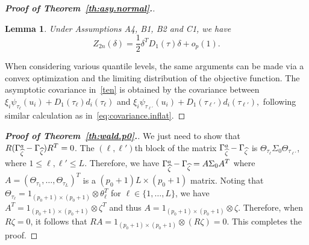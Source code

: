 \documentclass[times,sort&compress,3p]{elsarticle}
\theoremstyle{plain}%
\newtheorem{lemma}{Lemma}
\theoremstyle{definition}
\newcommand{\bD}{{D}}
\newcommand{\bR}{{R}}
\newcommand{\btheta}{{\theta}}
\newcommand{\bzeta}{{\zeta}}
\newcommand{\bxi}{{\xi}}
\begin{document}
\begin{proof}[\textbf{\upshape Proof of Theorem~\ref{th:asy.normal}.}]






\begin{lemma}
	\label{lemma:z2n}
	Under Assumptions A4, B1, B2 and C1, we have 
	\begin{equation}
	Z_{2n}({\delta}) = \frac{1}{2}{\delta}^T \bD_1(\tau) {\delta} + o_p(1).
	\end{equation} 
\end{lemma}

 When considering various quantile levels, the same arguments can be made via a convex optimization and the limiting distribution of the objective function. The asymptotic covariance in~\eqref{ten} is obtained by the covariance between 
$\bxi_{i} \psi_{\tau_{\ell}}({u}_i) + \bD_1(\tau_{\ell}) {d}_i(\tau_{\ell}) $ and $\bxi_{i} \psi_{\tau_{\ell'}}({u}_i) + \bD_1(\tau_{\ell'}) {d}_i(\tau_{\ell'}), $ following similar calculation as in~\eqref{eq:covariance.inflat}. 
\end{proof}

\begin{proof}[\textbf{\upshape Proof of Theorem~\ref{th:wald.p0}.}]
We just need to show that $\bR (\SigmaAdj_{\widehat \bzeta} - {\Gamma}_{\widehat \bzeta}) \bR^T = 0$. 
The $(\ell, \ell')$th block of the matrix $\SigmaAdj_{\widehat \bzeta} - {\Gamma}_{\widehat \bzeta}$ is $\Theta_{\tau_{\ell}} \Sigma_0 \Theta_{\tau_{\ell'}}$, where $1 \leq \ell, \ell' \leq L$. Therefore, we have $\SigmaAdj_{\widehat \bzeta} - {\Gamma}_{\widehat \bzeta} = A \Sigma_0 A^T$ where $A = (\Theta_{\tau_1}, \ldots, \Theta_{\tau_L})^T$ is a $(p_0+1)L \times (p_0+1)$ matrix. Noting that $\Theta_{\tau_{\ell}} = 1_{(p_0 + 1) \times (p_0 + 1)} \otimes \theta_{\ell}^T$ for $\ell \in \{ 1, \ldots, L\}$, we have $A^T = 1_{(p_0 + 1) \times (p_0 + 1)}  \otimes \bzeta^T $ and thus $A = 1_{(p_0 + 1) \times (p_0 + 1)}  \otimes \bzeta $. Therefore, when $R \bzeta = 0$, it follows that $R A = 1_{(p_0 + 1) \times (p_0 + 1)}  \otimes (R \bzeta) = 0$. This completes the proof.  
\end{proof} 
\end{document}
